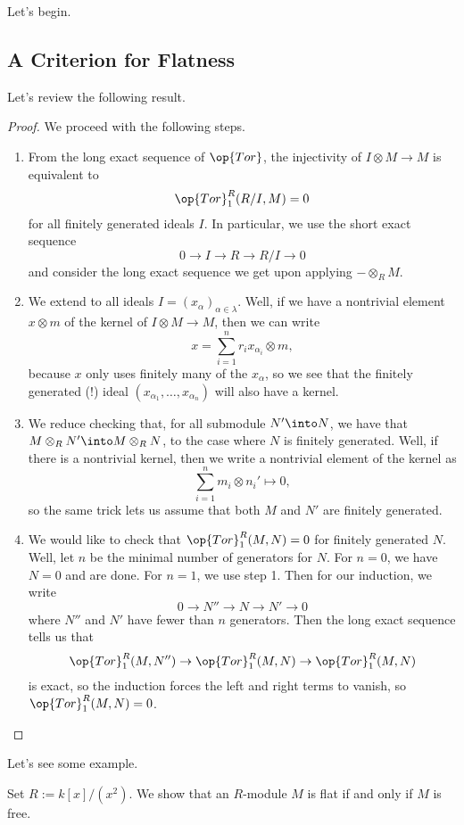 
Let's begin.

\subsection{A Criterion for Flatness}
Let's review the following result.
\flatcondition*
\begin{proof}
	We proceed with the following steps.
	\begin{enumerate}
		\item From the long exact sequence of $\op{Tor}$, the injectivity of $I\otimes M\to M$ is equivalent to
		\[\op{Tor}_1^R(R/I,M)=0\]
		for all finitely generated ideals $I$. In particular, we use the short exact sequence
		\[0\to I\to R\to R/I\to 0\]
		and consider the long exact sequence we get upon applying $-\otimes_RM$.
		\item We extend to all ideals $I=(x_\alpha)_{\alpha\in\lambda}$. Well, if we have a nontrivial element $x\otimes m$ of the kernel of $I\otimes M\to M$, then we can write
		\[x=\sum_{i=1}^nr_ix_{\alpha_i}\otimes m,\]
		because $x$ only uses finitely many of the $x_\alpha$, so we see that the finitely generated (!) ideal $(x_{\alpha_1},\ldots,x_{\alpha_n})$ will also have a kernel.
		\item We reduce checking that, for all submodule $N'\into N$, we have that $M\otimes_RN'\into M\otimes_RN$, to the case where $N$ is finitely generated. Well, if there is a nontrivial kernel, then we write a nontrivial element of the kernel as
		\[\sum_{i=1}^nm_i\otimes n_i'\mapsto0,\]
		so the same trick lets us assume that both $M$ and $N'$ are finitely generated.

		\item We would like to check that $\op{Tor}_1^R(M,N)=0$ for finitely generated $N$. Well, let $n$ be the minimal number of generators for $N$. For $n=0$, we have $N=0$ and are done. For $n=1$, we use step 1. Then for our induction, we write
		\[0\to N''\to N\to N'\to0\]
		where $N''$ and $N'$ have fewer than $n$ generators. Then the long exact sequence tells us that
		\[\op{Tor}_1^R(M,N'')\to\op{Tor}_1^R(M,N)\to\op{Tor}_1^R(M,N)\]
		is exact, so the induction forces the left and right terms to vanish, so $\op{Tor}_1^R(M,N)=0$.
		\qedhere
	\end{enumerate}
\end{proof}
Let's see some example.
\begin{exe}
	Set $R:=k[x]/\left(x^2\right)$. We show that an $R$-module $M$ is flat if and only if $M$ is free.
\end{exe}
